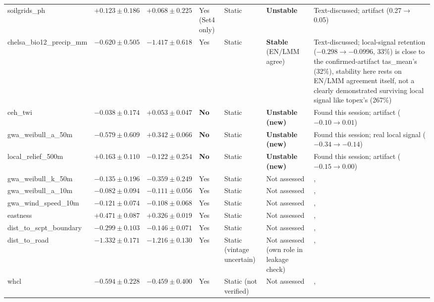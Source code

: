 \documentclass[logo,msc,ai]{infthesis}           %
\begin{document}
{\begin{longtable}{p{2.6cm}p{1.5cm}p{1.5cm}p{1.3cm}p{1.7cm}p{1.6cm}p{2.6cm}}
soilgrids\_ph & $+0.123\pm0.186$ & $+0.068\pm0.225$ & Yes (Set4 only) & Static & \textbf{Unstable} & Text-discussed; artifact (0.27$\to$0.05) \\
chelsa\_bio12\_precip\_mm & $-0.620\pm0.505$ & $-1.417\pm0.618$ & Yes & Static & \textbf{Stable} (EN/LMM agree) & Text-discussed; local-signal retention ($-0.298\to-0.0996$, 33\%) is close to the confirmed-artifact tas\_mean's (32\%), stability here rests on EN/LMM agreement itself, not a clearly demonstrated surviving local signal like topex's (267\%) \\
ceh\_twi & $-0.038\pm0.174$ & $+0.053\pm0.047$ & \textbf{No} & Static & \textbf{Unstable (new)} & Found this session; artifact ($-0.10\to0.01$) \\
gwa\_weibull\_a\_50m & $-0.579\pm0.609$ & $+0.342\pm0.066$ & \textbf{No} & Static & \textbf{Unstable (new)} & Found this session; real local signal ($-0.34\to-0.14$) \\
local\_relief\_500m & $+0.163\pm0.110$ & $-0.122\pm0.254$ & \textbf{No} & Static & \textbf{Unstable (new)} & Found this session; artifact ($-0.15\to0.00$) \\
gwa\_weibull\_k\_50m & $-0.135\pm0.196$ & $-0.359\pm0.249$ & Yes & Static & Not assessed &, \\
gwa\_weibull\_a\_10m & $-0.082\pm0.094$ & $-0.111\pm0.056$ & Yes & Static & Not assessed &, \\
gwa\_wind\_speed\_10m & $-0.121\pm0.074$ & $-0.108\pm0.068$ & Yes & Static & Not assessed &, \\
eastness & $+0.471\pm0.087$ & $+0.326\pm0.019$ & Yes & Static & Not assessed &, \\
dist\_to\_scpt\_boundary & $-0.299\pm0.103$ & $-0.146\pm0.071$ & Yes & Static & Not assessed &, \\
dist\_to\_road & $-1.332\pm0.171$ & $-1.216\pm0.130$ & Yes & Static (vintage uncertain) & Not assessed (own role in leakage check) &, \\
whcl & $-0.594\pm0.228$ & $-0.459\pm0.400$ & Yes & Static (not verified) & Not assessed &, \\
\end{longtable}
}
\end{document}
